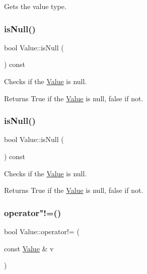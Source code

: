 Gets the value type. \mbox{\label{classValue_a920e68dea455df1b5857cd93790ff98a}} 
\subsubsection{\texorpdfstring{is\+Null()}{isNull()}\hspace{0.1cm}{\footnotesize\ttfamily [1/2]}}
{\footnotesize\ttfamily bool Value\+::is\+Null (\begin{DoxyParamCaption}{ }\end{DoxyParamCaption}) const\hspace{0.3cm}{\ttfamily [inline]}}

Checks if the \hyperlink{classValue}{Value} is null. \begin{DoxyReturn}{Returns}
True if the \hyperlink{classValue}{Value} is null, false if not. 
\end{DoxyReturn}
\mbox{\label{classValue_a920e68dea455df1b5857cd93790ff98a}} 
\subsubsection{\texorpdfstring{is\+Null()}{isNull()}\hspace{0.1cm}{\footnotesize\ttfamily [2/2]}}
{\footnotesize\ttfamily bool Value\+::is\+Null (\begin{DoxyParamCaption}{ }\end{DoxyParamCaption}) const\hspace{0.3cm}{\ttfamily [inline]}}

Checks if the \hyperlink{classValue}{Value} is null. \begin{DoxyReturn}{Returns}
True if the \hyperlink{classValue}{Value} is null, false if not. 
\end{DoxyReturn}
\mbox{\label{classValue_aa790fa6ea9b22f72910403872b67dae4}} 
\subsubsection{\texorpdfstring{operator"!=()}{operator!=()}\hspace{0.1cm}{\footnotesize\ttfamily [1/4]}}
{\footnotesize\ttfamily bool Value\+::operator!= (\begin{DoxyParamCaption}\item[{const \hyperlink{classValue}{Value} \&}]{v }\end{DoxyParamCaption})}

